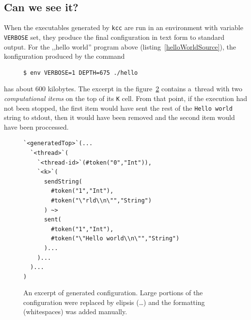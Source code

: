 \documentclass{fithesis3}
\newcommand{\kcc}{\texttt{kcc}\xspace}
\begin{document}
\subsection{Can we see it?}

When the executables generated by \kcc are run in an environment with variable \texttt{VERBOSE} set, they produce the final configuration in text form to standard output. For the ,,hello world'' program above (listing~\ref{helloWorldSource}), the konfiguration produced by
the command
\begin{figure}[h]
\begin{lstlisting}[language=bash]
$ env VERBOSE=1 DEPTH=675 ./hello
\end{lstlisting}
\label{exampleConfigurationCommand}
\end{figure}

has about 600 kilobytes. The excerpt in the figure~\ref{exampleConfigurationOutput} contains a~thread with two \textit{computational items} on the top of its \texttt{K} cell. From that point, if the execution had not been stopped, the first item would have sent the rest of the \texttt{Hello world} string to stdout, then it would have been removed and the second item would have been proccessed.

\begin{figure}[h]
\begin{lstlisting}
`<generatedTop>`(...
  `<thread>`(
    `<thread-id>`(#token("0","Int")),
    `<k>`(
      sendString(
        #token("1","Int"),
        #token("\"rld\\n\"","String")
      ) ~>
      sent(
        #token("1","Int"),
        #token("\"Hello world\\n\"","String")
      )...
    )...
  )...
)
\end{lstlisting}
\caption{An excerpt of 
generated configuration.
Large portions of the configuration were replaced by elipsis (\ldots) and the formatting (whitespaces) was added manually.}
\label{exampleConfigurationOutput}
\end{figure}



\end{document}
